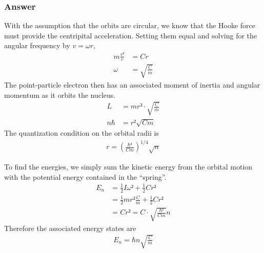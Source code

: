 \subsubsection{Answer}

With the assumption that the orbits are circular, we know that the Hooke 
force must provide the centripital acceleration. Setting them equal and 
solving for the angular frequency by $v = ωr$,
\begin{align*}
	m \frac{v²}{r} &= Cr \\
	ω &= \sqrt{\frac{C}{m}}
\end{align*}
The point-particle electron then has an associated moment of inertia and 
angular momentum as it orbits the nucleus.
\begin{align*}
	L &= mr² ⋅ \sqrt{\frac{C}{m}} \\
	nℏ &= r² \sqrt{Cm}
\end{align*}
The quantization condition on the orbital radii is
\begin{align}
	\boxed{ r = (\frac{ℏ²}{Cm})^{1/4} \sqrt{n} }
\end{align}

To find the energies, we simply sum the kinetic energy from the orbital 
motion with the potential energy contained in the ``spring''.
\begin{align*}
	E_n &= \frac 12 I ω² + \frac 12 C r² \\
	&= \frac 12 m r² \frac{C}{m} + \frac 12 C r² \\
	&= C r² = C ⋅ \sqrt{\frac{ℏ²}{Cm}} n
\end{align*}
Therefore the associated energy states are
\begin{align}
	\boxed{ E_n = ℏn\sqrt{\frac{C}{m}} }
\end{align}
